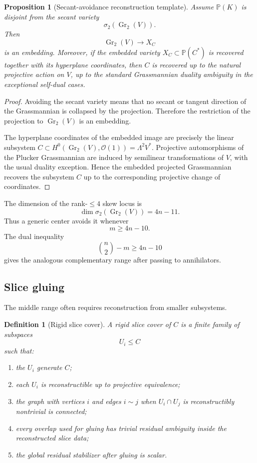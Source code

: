 \documentclass[11pt]{article}
\newtheorem{proposition}[theorem]{Proposition}
\newtheorem{definition}[theorem]{Definition}
\begin{document}
\begin{proposition}[Secant-avoidance reconstruction template]
Assume $\mathbb P(K)$ is disjoint from the secant variety
\[
\sigma_2(\operatorname{Gr}_2(V)).
\]
Then
\[
\operatorname{Gr}_2(V)\to X_C
\]
is an embedding. Moreover, if the embedded variety $X_C\subset\mathbb P(C^*)$ is recovered together with its hyperplane coordinates, then $C$ is recovered up to the natural projective action on $V$, up to the standard Grassmannian duality ambiguity in the exceptional self-dual cases.
\end{proposition}

\begin{proof}
Avoiding the secant variety means that no secant or tangent direction of the Grassmannian is collapsed by the projection. Therefore the restriction of the projection to $\operatorname{Gr}_2(V)$ is an embedding.

The hyperplane coordinates of the embedded image are precisely the linear subsystem $C\subset H^0(\operatorname{Gr}_2(V),\mathcal O(1))=\Lambda^2V^*$. Projective automorphisms of the Plucker Grassmannian are induced by semilinear transformations of $V$, with the usual duality exception. Hence the embedded projected Grassmannian recovers the subsystem $C$ up to the corresponding projective change of coordinates.
\end{proof}

The dimension of the rank-$\le4$ skew locus is
\[
\dim\sigma_2(\operatorname{Gr}_2(V))=4n-11.
\]
Thus a generic center avoids it whenever
\[
m\ge4n-10.
\]
The dual inequality
\[
\binom n2-m\ge4n-10
\]
gives the analogous complementary range after passing to annihilators.

\subsection{Slice gluing}

The middle range often requires reconstruction from smaller subsystems.

\begin{definition}[Rigid slice cover]
A rigid slice cover of $C$ is a finite family of subspaces
\[
U_i\le C
\]
such that:
\begin{enumerate}[label=\roman*.]
\item the $U_i$ generate $C$;
\item each $U_i$ is reconstructible up to projective equivalence;
\item the graph with vertices $i$ and edges $i\sim j$ when $U_i\cap U_j$ is reconstructibly nontrivial is connected;
\item every overlap used for gluing has trivial residual ambiguity inside the reconstructed slice data;
\item the global residual stabilizer after gluing is scalar.
\end{enumerate}
\end{definition}
\end{document}
